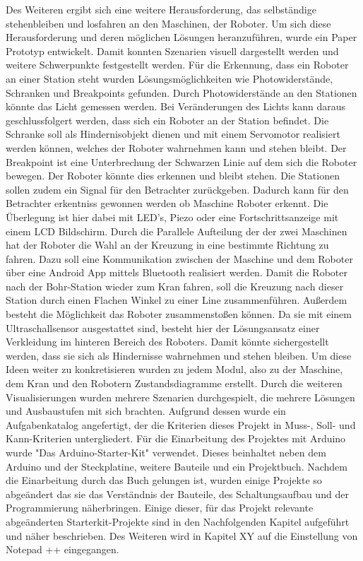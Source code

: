 Des Weiteren ergibt sich eine weitere Herausforderung, das selbständige stehenbleiben und losfahren an den Maschinen, der Roboter. Um sich diese Herausforderung und deren möglichen Lösungen heranzuführen, wurde ein Paper Prototyp entwickelt. Damit konnten Szenarien visuell dargestellt werden und weitere Schwerpunkte festgestellt werden. Für die Erkennung, dass ein Roboter an einer Station steht wurden Lösungsmöglichkeiten wie Photowiderstände, Schranken und Breakpoints gefunden. Durch Photowiderstände an den Stationen könnte das Licht gemessen werden. Bei Veränderungen des Lichts kann daraus geschlussfolgert werden, dass sich ein Roboter an der Station befindet. Die Schranke soll als Hindernisobjekt dienen und mit einem Servomotor realisiert werden können, welches der Roboter wahrnehmen kann und stehen bleibt. Der Breakpoint ist eine Unterbrechung der Schwarzen Linie auf dem sich die Roboter bewegen. Der Roboter könnte dies erkennen und bleibt stehen. Die Stationen sollen zudem ein Signal für den Betrachter zurückgeben. Dadurch kann für den Betrachter erkentniss gewonnen werden ob Maschine Roboter erkennt. Die Überlegung ist hier dabei mit LED’s, Piezo oder eine Fortschrittsanzeige mit einem LCD Bildschirm.
Durch die Parallele Aufteilung der der zwei Maschinen hat der Roboter die Wahl an der Kreuzung in eine bestimmte Richtung zu fahren. Dazu soll eine Kommunikation zwischen der Maschine und dem Roboter über eine Android App mittels Bluetooth realisiert werden. Damit die Roboter nach der Bohr-Station wieder zum Kran fahren, soll die Kreuzung nach dieser Station durch einen Flachen Winkel zu einer Line zusammenführen. Außerdem besteht die Möglichkeit das Roboter zusammenstoßen können. Da sie mit einem Ultraschallsensor ausgestattet sind, besteht hier der Lösungsansatz einer Verkleidung im hinteren Bereich des Roboters. Damit könnte sichergestellt werden, dass sie sich als Hindernisse wahrnehmen und stehen bleiben. 
Um diese Ideen weiter zu konkretisieren wurden zu jedem Modul, also zu der Maschine, dem Kran und den Robotern Zustandsdiagramme erstellt.
Durch die weiteren Visualisierungen wurden mehrere Szenarien durchgespielt, die mehrere Lösungen und Ausbaustufen mit sich brachten. Aufgrund dessen wurde ein Aufgabenkatalog angefertigt, der die Kriterien dieses Projekt in Muss-, Soll- und Kann-Kriterien untergliedert.
Für die Einarbeitung des Projektes mit Arduino wurde "Das Arduino-Starter-Kit" verwendet. Dieses beinhaltet neben dem Arduino und der Steckplatine, weitere Bauteile und ein Projektbuch. Nachdem die Einarbeitung durch das Buch gelungen ist, wurden einige Projekte so abgeändert das sie das Verständnis der Bauteile, des Schaltungsaufbau und der Programmierung näherbringen. Einige dieser, für das Projekt relevante abgeänderten Starterkit-Projekte sind in den Nachfolgenden Kapitel aufgeführt und näher beschrieben. Des Weiteren wird in Kapitel XY auf die Einstellung von Notepad ++ eingegangen. 



